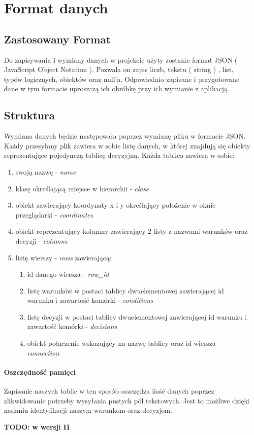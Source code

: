 \documentclass{article}
\begin{document}
\section{Format danych}
\subsection{Zastosowany Format}
Do zapisywania i wymiany danych w projekcie użyty zostanie format JSON ( JavaScript Object Notation ). Pozwala on zapis liczb, tekstu ( string ) , list, typów logicznych, obiektów oraz null'a. Odpowiednio zapisane i przygotowane dane w tym formacie uproszczą ich obróbkę przy ich wymianie z aplikacją.
\subsection{Struktura}
Wymiana danych będzie następowała poprzez wymianę pliku w formacie JSON. Każdy przesyłany plik zawiera w sobie listę danych, w której znajdują się obiekty reprezentujące pojedynczą tablicę decyzyjną. Każda tablica zawiera w sobie: 
\begin{enumerate}
    \item swoją nazwę - \textit{name}
    \item klasę określającą miejsce w hierarchii - \textit{class}
    \item obiekt zawierający koordynaty x i y określający położenie w oknie przeglądarki - \textit{coordinates}
    \item obiekt reprezentujący kolumny zawierający 2 listy z nazwami warunków oraz decyzji - \textit{columns}
    \item listę wierszy - \textit{rows}  zawierającą:
    \begin{enumerate}
        \item id danego wiersza - \textit{row\_id} 
        \item listę warunków w postaci tablicy dwuelementowej zawierającej id warunku i zawartość komórki - \textit{ conditions }
        \item listę decyzji w postaci tablicy dwuelementowej zawierającej id warunku i zawartość komórki  - \textit{ decisions }
        \item obiekt połączenie wskazujący na nazwę tablicy oraz id wiersza - \textit{ connection }
    \end{enumerate}
\end{enumerate}
\paragraph{Oszczędność pamięci} Zapisanie naszych tablic w ten sposób oszczędza ilość danych poprzez zlikwidowanie potrzeby wysyłania pustych pól tekstowych. Jest to możliwe dzięki nadaniu identyfikacji naszym warunkom oraz decyzjom.


\textbf{TODO: w wersji II}
\end{document}
